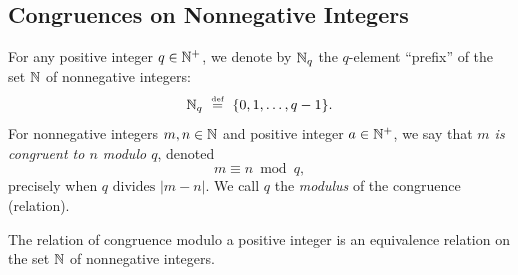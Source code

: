 \subsection{Congruences on Nonnegative Integers}
\label{sec:congruences}

For any positive integer $q \in \mathbb{N}^+$, we denote by $\mathbb{N}_q$ the
$q$-element ``prefix'' of the set $\mathbb{N}$ of nonnegative integers:
\[ \mathbb{N}_q \ \stackrel{\mbox{{\tiny def}}}{=} \ \{0, 1, \ldots, q-1\} . \]
For nonnegative integers $m, n \in \mathbb{N}$ and positive integer $a \in
\mathbb{N}^+$, we say that {\em $m$ is congruent to $n$ modulo $q$},
  denoted
\[ m \equiv n \bmod q, \]
precisely when $q \mbox{ divides } |m-n|$.  We call $q$ the {\it
  modulus} of the congruence (relation).

\begin{prop}
\label{thm:CONGisEQUIVALENCE-REL}
The relation of congruence modulo a positive integer is an equivalence
relation on the set $\mathbb{N}$ of nonnegative integers.
\end{prop}

